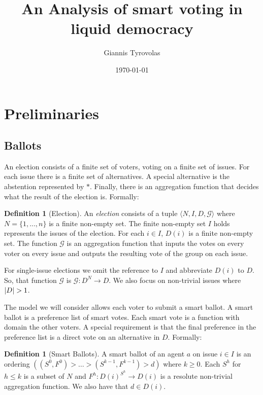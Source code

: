 \documentclass[11pt,a4paper, titlepage]{article}
\title{An Analysis of smart voting in liquid democracy}
\author{Giannis Tyrovolas}
\date{\today}
\DeclarePairedDelimiter\abs{\lvert}{\rvert}
\theoremstyle{definition}
\newtheorem{definition}[theorem]{Definition}
\begin{document}
\maketitle

\tableofcontents

\newpage

\section{Preliminaries}

\subsection{Ballots}


An election consists of a finite set of voters, voting on a finite set of issues. For each issue there is a finite set of alternatives. A special alternative is the abstention represented by $*$. Finally, there is an aggregation function that decides what the result of the election is. Formally:

\begin{definition}[Election]
    An \emph{election} consists of a tuple $\langle N, I, D, \mathcal{G}\rangle $ where $N = \{1,..., n\} $ is a finite non-empty set. The finite non-empty set $I$ holds represents the issues of the election. For each $i \in I$, $D(i)$ is a finite non-empty set. The function $\mathcal{G}$ is an aggregation function that inputs the votes on every voter on every issue and outputs the resulting vote of the group on each issue.
\end{definition}

For single-issue elections we omit the reference to $I$ and abbreviate $D(i)$ to $D$. So, that function $\mathcal{G}$ is $\mathcal{G} \colon D^N \longrightarrow D$. We also focus on non-trivial issues where $\abs{D} > 1$.

The model we will consider allows each voter to submit a smart ballot. A smart ballot is a preference list of smart votes. Each smart vote is a function with domain the other voters. A special requirement is that the final preference in the preference list is a direct vote on an alternative in $D$. Formally:

\begin{definition}[Smart Ballots]
    A smart ballot of an agent $a$ on issue $i \in I$ is an ordering $( (S^0, F^0) > \ldots > (S^{k-1}, F^{k-1}) > d)$ where $k \geq 0$. Each $S^h$ for $h \leq k$ is a subset of $N$ and $F^h \colon D(i)^{S^h} \longrightarrow D(i)$ is a resolute non-trivial aggregation function. We also have that $d \in D(i)$.   
\end{definition}
\end{document}
